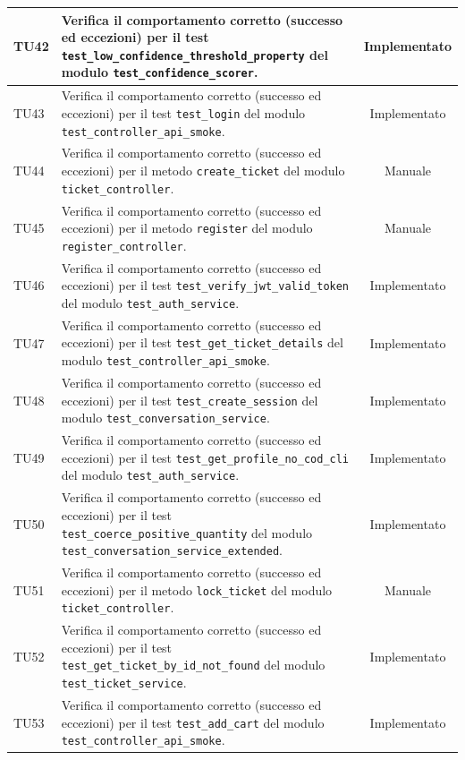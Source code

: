 \documentclass[a4paper,11pt,oneside]{scrartcl}
\begin{document}
\begin{longtable}{|p{1.9cm}|p{11.6cm}|c|}
    TU42 & Verifica il comportamento corretto (successo ed eccezioni) per il test \texttt{test\_low\_confidence\_threshold\_property} del modulo \texttt{test\_confidence\_scorer}. & Implementato \\ \hline
    TU43 & Verifica il comportamento corretto (successo ed eccezioni) per il test \texttt{test\_login} del modulo \texttt{test\_controller\_api\_smoke}. & Implementato \\ \hline
    TU44 & Verifica il comportamento corretto (successo ed eccezioni) per il metodo \texttt{create\_ticket} del modulo \texttt{ticket\_controller}. & Manuale \\ \hline
    TU45 & Verifica il comportamento corretto (successo ed eccezioni) per il metodo \texttt{register} del modulo \texttt{register\_controller}. & Manuale \\ \hline
    TU46 & Verifica il comportamento corretto (successo ed eccezioni) per il test \texttt{test\_verify\_jwt\_valid\_token} del modulo \texttt{test\_auth\_service}. & Implementato \\ \hline
    TU47 & Verifica il comportamento corretto (successo ed eccezioni) per il test \texttt{test\_get\_ticket\_details} del modulo \texttt{test\_controller\_api\_smoke}. & Implementato \\ \hline
    TU48 & Verifica il comportamento corretto (successo ed eccezioni) per il test \texttt{test\_create\_session} del modulo \texttt{test\_conversation\_service}. & Implementato \\ \hline
    TU49 & Verifica il comportamento corretto (successo ed eccezioni) per il test \texttt{test\_get\_profile\_no\_cod\_cli} del modulo \texttt{test\_auth\_service}. & Implementato \\ \hline
    TU50 & Verifica il comportamento corretto (successo ed eccezioni) per il test \texttt{test\_coerce\_positive\_quantity} del modulo \texttt{test\_conversation\_service\_extended}. & Implementato \\ \hline
    TU51 & Verifica il comportamento corretto (successo ed eccezioni) per il metodo \texttt{lock\_ticket} del modulo \texttt{ticket\_controller}. & Manuale \\ \hline
    TU52 & Verifica il comportamento corretto (successo ed eccezioni) per il test \texttt{test\_get\_ticket\_by\_id\_not\_found} del modulo \texttt{test\_ticket\_service}. & Implementato \\ \hline
    TU53 & Verifica il comportamento corretto (successo ed eccezioni) per il test \texttt{test\_add\_cart} del modulo \texttt{test\_controller\_api\_smoke}. & Implementato \\ \hline

\end{longtable}
\end{document}
